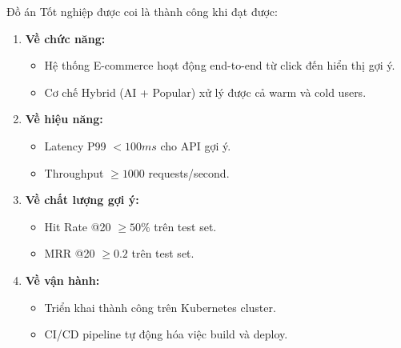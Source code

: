Đồ án Tốt nghiệp được coi là thành công khi đạt được:

\begin{enumerate}
    \item \textbf{Về chức năng:}
    \begin{itemize}
        \item Hệ thống E-commerce hoạt động end-to-end từ click đến hiển thị gợi ý.
        \item Cơ chế Hybrid (AI + Popular) xử lý được cả warm và cold users.
    \end{itemize}

    \item \textbf{Về hiệu năng:}
    \begin{itemize}
        \item Latency P99 $<100ms$ cho API gợi ý.
        \item Throughput $\geq 1000$ requests/second.
    \end{itemize}

    \item \textbf{Về chất lượng gợi ý:}
    \begin{itemize}
        \item Hit Rate @20 $\geq 50\%$ trên test set.
        \item MRR @20 $\geq 0.2$ trên test set.
    \end{itemize}

    \item \textbf{Về vận hành:}
    \begin{itemize}
        \item Triển khai thành công trên Kubernetes cluster.
        \item CI/CD pipeline tự động hóa việc build và deploy.
    \end{itemize}
\end{enumerate}
